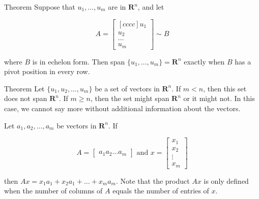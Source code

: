         \begin{theorem}{Theorem}
            Suppose that $u_1, \dots, u_m$ are in $\mathbf{R}^n$, and let

            \[
                A =
                \begin{bmatrix}[cccc]
                    u_1 \\
                    u_2 \\
                    \dots \\
                    u_m
                \end{bmatrix}
                \sim B
            \]

            where $B$ is in echelon form. Then span $\{u_1, \dots, u_m\} = \mathbf{R}^n$ exactly when $B$ has a pivot position in every row.
        \end{theorem}

        \begin{theorem}{Theorem}
            Let $\{u_1, u_2, \dots, u_m\}$ be a set of vectors in $\mathbf{R}^n$. If $m < n$, then this set does not span $\mathbf{R}^n$. If $m \geq n$, then the set might span $\mathbf{R}^n$ or it might not. In this
            case, we cannot say more without additional information about the vectors.
        \end{theorem}

        Let $a_1, a_2, \dots, a_m$ be vectors in $\mathbf{R}^n$. If

        \[
            A =
            \begin{bmatrix}
                a_1 a_2 \dots a_m
            \end{bmatrix}
            \text{ and }
            x =
            \begin{bmatrix}
                x_1 \\
                x_2 \\
                \vdots \\
                x_m
            \end{bmatrix}
        \]

        then $Ax = x_1 a_1 + x_2 a_1 + \dots + x_m a_m$. Note that the product $Ax$ is only defined when the number of columns of $A$ equals the number of entries of $x$.

